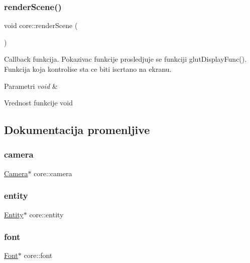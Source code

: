 \subsubsection{\texorpdfstring{render\+Scene()}{renderScene()}}
{\footnotesize\ttfamily void core\+::render\+Scene (\begin{DoxyParamCaption}\item[{void}]{ }\end{DoxyParamCaption})}



Callback funkcija. Pokazivac funkcije prosledjuje se funkciji glut\+Display\+Func(). Funkcija koja kontrolise sta ce biti iscrtano na ekranu. 


\begin{DoxyParams}{Parametri}
{\em void} & \\
\hline
\end{DoxyParams}
\begin{DoxyReturn}{Vrednost funkcije}
void 
\end{DoxyReturn}


\subsection{Dokumentacija promenljive}
\mbox{\label{namespacecore_a9d645c490b142886301256f6cf9c65c2}} 
\subsubsection{\texorpdfstring{camera}{camera}}
{\footnotesize\ttfamily \hyperlink{classentity_1_1Camera}{Camera}$\ast$ core\+::camera}

\mbox{\label{namespacecore_aa710c0ea388433d2d80d1d1c67582eda}} 
\subsubsection{\texorpdfstring{entity}{entity}}
{\footnotesize\ttfamily \hyperlink{classentity_1_1Entity}{Entity}$\ast$ core\+::entity}

\mbox{\label{namespacecore_a9c0aadaade788b336cfbba4db9c87a8e}} 
\subsubsection{\texorpdfstring{font}{font}}
{\footnotesize\ttfamily \hyperlink{classfont_1_1Font}{Font}$\ast$ core\+::font}

